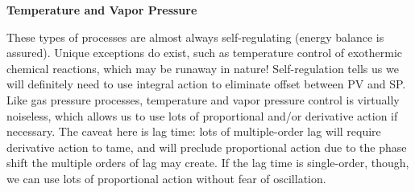 \vskip 20pt

\noindent
{\bf Temperature and Vapor Pressure}

These types of processes are almost always self-regulating (energy balance is assured).  Unique exceptions do exist, such as temperature control of exothermic chemical reactions, which may be runaway in nature!  Self-regulation tells us we will definitely need to use integral action to eliminate offset between PV and SP.  Like gas pressure processes, temperature and vapor pressure control is virtually noiseless, which allows us to use lots of proportional and/or derivative action if necessary.  The caveat here is lag time: lots of multiple-order lag will require derivative action to tame, and will preclude proportional action due to the phase shift the multiple orders of lag may create.  If the lag time is single-order, though, we can use lots of proportional action without fear of oscillation.






